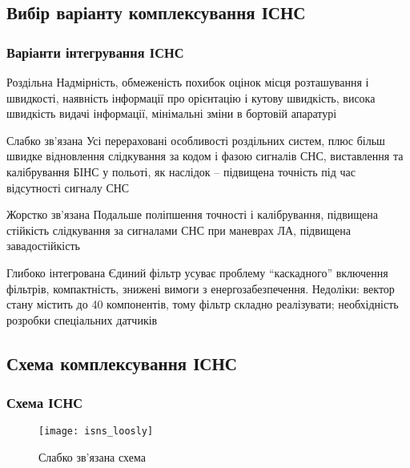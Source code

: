 \documentclass[ucs]{beamer}
\begin{document}
\subsection{Вибір варіанту комплексування ІСНС } 
\begin{frame}\frametitle{Варіанти інтегрування ІСНС} 

\tiny
\begin{block}{Роздільна}
Надмірність, обмеженість похибок оцінок місця розташування і швидкості, 
наявність інформації про орієнтацію і кутову швидкість, висока швидкість видачі інформації, 
мінімальні зміни в бортовій апаратурі
\end{block}

\begin{exampleblock}{Слабко зв'язана}
Усі перераховані особливості роздільних систем, плюс більш 
швидке відновлення слідкування за кодом і фазою сигналів СНС, виставлення та калібрування 
БІНС у польоті, як наслідок -- підвищена точність під час відсутності сигналу СНС
\end{exampleblock}


\begin{block}{Жорстко зв'язана}
Подальше поліпшення точності і калібрування, підвищена стійкість слідкування 
за сигналами СНС при маневрах ЛА, підвищена завадостійкість 
\end{block}

\begin{block}{Глибоко інтегрована}
Єдиний фільтр усуває проблему ``каскадного'' включення 
фільтрів, компактність, знижені вимоги з енергозабезпечення. Недоліки: вектор стану 
містить до 40 компонентів, тому фільтр складно реалізувати; необхідність розробки 
спеціальних датчиків 
\end{block}
\end{frame}


\subsection{Схема комплексування ІСНС }
\begin{frame} \frametitle{Схема ІСНС} 
\begin{figure}[here]
\centering
\texttt{[image: isns\_loosly]}
\caption{Слабко зв’язана схема}
\end{figure}
\end{frame}
\end{document}
